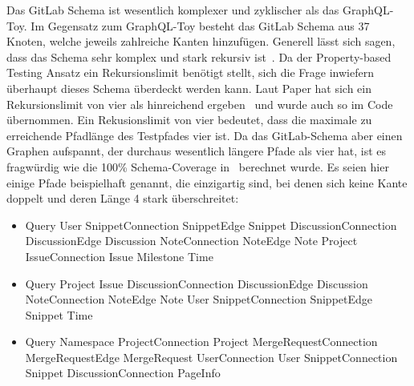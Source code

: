 Das GitLab Schema ist wesentlich komplexer und zyklischer als das GraphQL-Toy.
Im Gegensatz zum GraphQL-Toy besteht das GitLab Schema aus 37 Knoten, welche jeweils zahlreiche Kanten hinzufügen.
Generell lässt sich sagen, dass das Schema sehr komplex und stark rekursiv ist~\cite[vgl. Studied Cases 2]{property-based-testing}.
Da der Property-based Testing Ansatz ein Rekursionslimit benötigt stellt, sich die Frage inwiefern überhaupt dieses Schema überdeckt werden kann.
Laut Paper hat sich ein Rekursionslimit von vier als hinreichend ergeben~\cite[vgl. Table 1 ]{property-based-testing} und wurde auch so im Code übernommen.
Ein Rekusionslimit von vier bedeutet, dass die maximale zu erreichende Pfadlänge des Testpfades vier ist.
Da das GitLab-Schema aber einen Graphen aufspannt, der durchaus wesentlich längere Pfade als vier hat, ist es fragwürdig wie die 100\% Schema-Coverage in~\cite[Table 1]{property-based-testing} berechnet wurde.
Es seien hier einige Pfade beispielhaft genannt, die einzigartig sind, bei denen sich keine Kante doppelt und deren Länge 4 stark überschreitet: \\

\begin{itemize}
    \item Query \textrightarrow User \textrightarrow SnippetConnection \textrightarrow SnippetEdge \textrightarrow Snippet \textrightarrow DiscussionConnection \textrightarrow DiscussionEdge \textrightarrow Discussion \textrightarrow NoteConnection \textrightarrow NoteEdge \textrightarrow Note \textrightarrow Project \textrightarrow IssueConnection \textrightarrow Issue \textrightarrow Milestone \textrightarrow Time
    \item Query \textrightarrow Project \textrightarrow Issue \textrightarrow DiscussionConnection \textrightarrow DiscussionEdge \textrightarrow Discussion \textrightarrow NoteConnection \textrightarrow NoteEdge \textrightarrow Note \textrightarrow User \textrightarrow SnippetConnection \textrightarrow SnippetEdge \textrightarrow Snippet \textrightarrow Time \\
    \item Query \textrightarrow Namespace \textrightarrow ProjectConnection \textrightarrow Project \textrightarrow MergeRequestConnection \textrightarrow MergeRequestEdge \textrightarrow MergeRequest \textrightarrow UserConnection \textrightarrow User \textrightarrow SnippetConnection \textrightarrow Snippet \textrightarrow DiscussionConnection \textrightarrow PageInfo \\
\end{itemize}

